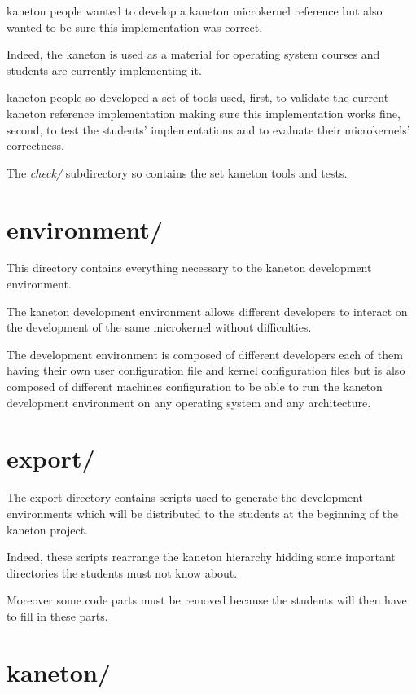 kaneton people wanted to develop a kaneton microkernel reference but
also wanted to be sure this implementation was correct.

Indeed, the kaneton is used as a material for operating system courses and
students are currently implementing it.

kaneton people so developed a set of tools used, first, to validate the
current kaneton reference implementation making sure this implementation
works fine, second, to test the students' implementations and to evaluate
their microkernels' correctness.

The \textit{check/} subdirectory so contains the set kaneton tools and tests.

%
%

\section{environment/}

This directory contains everything necessary to the kaneton
development environment.

The kaneton development environment allows different developers to
interact on the development of the same microkernel without difficulties.

The development environment is composed of different developers each
of them having their own user configuration file and kernel configuration
files but is also composed of different machines configuration to be able
to run the kaneton development environment on any operating system and any
architecture.

%
%

\section{export/}

The export directory contains scripts used to generate the
development environments which will be distributed to the students
at the beginning of the kaneton project.

Indeed, these scripts rearrange the kaneton hierarchy hidding some
important directories the students must not know about.

Moreover some code parts must be removed because the students will
then have to fill in these parts.

%
%

\section{kaneton/}

